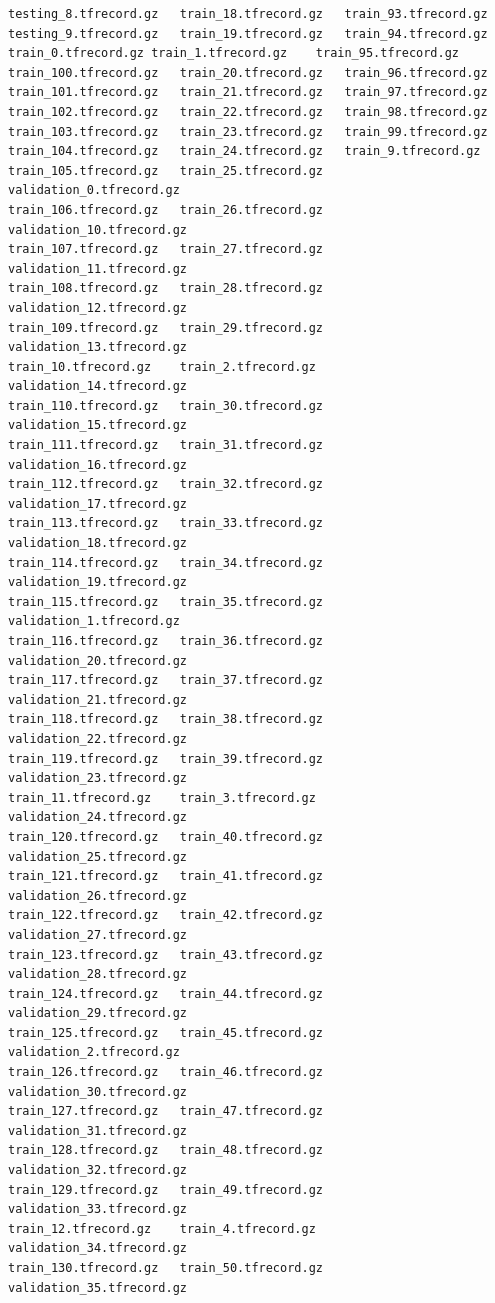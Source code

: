 \documentclass[
  letterpaper,
  DIV=11,
  numbers=noendperiod]{scrreprt}
\begin{document}
\begin{verbatim}
testing_8.tfrecord.gz   train_18.tfrecord.gz   train_93.tfrecord.gz
testing_9.tfrecord.gz   train_19.tfrecord.gz   train_94.tfrecord.gz
train_0.tfrecord.gz train_1.tfrecord.gz    train_95.tfrecord.gz
train_100.tfrecord.gz   train_20.tfrecord.gz   train_96.tfrecord.gz
train_101.tfrecord.gz   train_21.tfrecord.gz   train_97.tfrecord.gz
train_102.tfrecord.gz   train_22.tfrecord.gz   train_98.tfrecord.gz
train_103.tfrecord.gz   train_23.tfrecord.gz   train_99.tfrecord.gz
train_104.tfrecord.gz   train_24.tfrecord.gz   train_9.tfrecord.gz
train_105.tfrecord.gz   train_25.tfrecord.gz   validation_0.tfrecord.gz
train_106.tfrecord.gz   train_26.tfrecord.gz   validation_10.tfrecord.gz
train_107.tfrecord.gz   train_27.tfrecord.gz   validation_11.tfrecord.gz
train_108.tfrecord.gz   train_28.tfrecord.gz   validation_12.tfrecord.gz
train_109.tfrecord.gz   train_29.tfrecord.gz   validation_13.tfrecord.gz
train_10.tfrecord.gz    train_2.tfrecord.gz    validation_14.tfrecord.gz
train_110.tfrecord.gz   train_30.tfrecord.gz   validation_15.tfrecord.gz
train_111.tfrecord.gz   train_31.tfrecord.gz   validation_16.tfrecord.gz
train_112.tfrecord.gz   train_32.tfrecord.gz   validation_17.tfrecord.gz
train_113.tfrecord.gz   train_33.tfrecord.gz   validation_18.tfrecord.gz
train_114.tfrecord.gz   train_34.tfrecord.gz   validation_19.tfrecord.gz
train_115.tfrecord.gz   train_35.tfrecord.gz   validation_1.tfrecord.gz
train_116.tfrecord.gz   train_36.tfrecord.gz   validation_20.tfrecord.gz
train_117.tfrecord.gz   train_37.tfrecord.gz   validation_21.tfrecord.gz
train_118.tfrecord.gz   train_38.tfrecord.gz   validation_22.tfrecord.gz
train_119.tfrecord.gz   train_39.tfrecord.gz   validation_23.tfrecord.gz
train_11.tfrecord.gz    train_3.tfrecord.gz    validation_24.tfrecord.gz
train_120.tfrecord.gz   train_40.tfrecord.gz   validation_25.tfrecord.gz
train_121.tfrecord.gz   train_41.tfrecord.gz   validation_26.tfrecord.gz
train_122.tfrecord.gz   train_42.tfrecord.gz   validation_27.tfrecord.gz
train_123.tfrecord.gz   train_43.tfrecord.gz   validation_28.tfrecord.gz
train_124.tfrecord.gz   train_44.tfrecord.gz   validation_29.tfrecord.gz
train_125.tfrecord.gz   train_45.tfrecord.gz   validation_2.tfrecord.gz
train_126.tfrecord.gz   train_46.tfrecord.gz   validation_30.tfrecord.gz
train_127.tfrecord.gz   train_47.tfrecord.gz   validation_31.tfrecord.gz
train_128.tfrecord.gz   train_48.tfrecord.gz   validation_32.tfrecord.gz
train_129.tfrecord.gz   train_49.tfrecord.gz   validation_33.tfrecord.gz
train_12.tfrecord.gz    train_4.tfrecord.gz    validation_34.tfrecord.gz
train_130.tfrecord.gz   train_50.tfrecord.gz   validation_35.tfrecord.gz

\end{verbatim}
\end{document}
